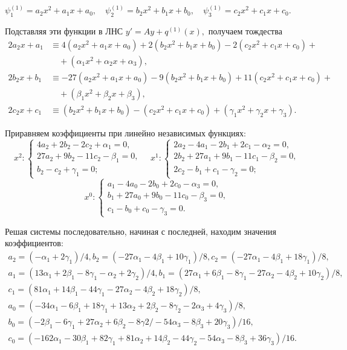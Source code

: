 \documentclass[11pt]{article}
\begin{document}
{\smallskip
$\psi_1^{(1)} = a_2 x^2 + a_1 x + a_0, \quad \psi_2^{(1)} = b_2 x^2 + b_1 x + b_0, \quad \psi_3^{(1)} = c_2 x^2 + c_1 x + c_0.$

\smallskip
Подставляя эти функции в ЛНС $y'=Ay+q^{(1)}(x),$ получаем тождества
\begin{align*}
2a_2 x + a_1 &\equiv 4(a_2 x^2 + a_1 x + a_0) + 2(b_2 x^2 + b_1 x + b_0) - 2(c_2 x^2 + c_1 x + c_0) +\\
             &\quad + (\alpha_1 x^2 + \alpha_2 x + \alpha_3), \\
2b_2 x + b_1 &\equiv -27(a_2 x^2 + a_1 x + a_0) - 9(b_2 x^2 + b_1 x + b_0) + 11(c_2 x^2 + c_1 x + c_0) +\\
             &\quad + (\beta_1 x^2 + \beta_2 x + \beta_3), \\
2c_2 x + c_1 &\equiv (b_2 x^2 + b_1 x + b_0) - (c_2 x^2 + c_1 x + c_0) + (\gamma_1 x^2 + \gamma_2 x + \gamma_3).
\end{align*}

\smallskip
Приравняем коэффициенты при линейно независимых функциях:
$$x^2:
\begin{cases}
4a_2 + 2b_2 - 2c_2 + \alpha_1 = 0, \\
27a_2 + 9b_2 - 11c_2 - \beta_1 = 0, \\
b_2 - c_2 + \gamma_1 = 0;
\end{cases} \quad
x^1:
\begin{cases}
2a_2 - 4a_1 - 2b_1 + 2c_1 - \alpha_2 = 0, \\
2b_2 + 27a_1 + 9b_1 - 11c_1 - \beta_2 = 0, \\
2c_2 -b_1 + c_1 - \gamma_2 = 0;
\end{cases}
$$
$$x^0:
\begin{cases}
a_1 - 4a_0 - 2b_0 + 2c_0 - \alpha_3 = 0, \\
b_1 + 27a_0 + 9b_0 - 11c_0 - \beta_3 = 0, \\
c_1 - b_0 + c_0 - \gamma_3 = 0.
\end{cases}
$$

Решая системы последовательно, начиная с последней, находим значения коэффициентов:
\[
\begin{array}{ll}
a_2 = (-\alpha_1 + 2\gamma_1)/4, b_2 = (-27\alpha_1 - 4\beta_1 + 10\gamma_1)/8, c_2 = (-27\alpha_1 - 4\beta_1 + 18\gamma_1)/8, & \\[6pt]
a_1 = (13\alpha_1 + 2\beta_1 - 8\gamma_1  - \alpha_2 + 2\gamma_2)/4, b_1 = (27\alpha_1 + 6\beta_1 - 8\gamma_1 -27\alpha_2 - 4\beta_2 + 10\gamma_2)/8, & \\
c_1 = (81\alpha_1 + 14\beta_1 - 44\gamma_1 - 27\alpha_2 - 4\beta_2 + 18\gamma_2)/8, & \\[6pt]
a_0 = (-34\alpha_1 - 6\beta_1 + 18\gamma_1 + 13\alpha_2 + 2\beta_2 - 8\gamma_2 - 2\alpha_3 + 4\gamma_3)/8, & \\[3pt]
b_0 = (-2\beta_1 - 6\gamma_1 + 27\alpha_2 + 6\beta_2 - 8\gamma2/ - 54\alpha_3 - 8\beta_3 + 20\gamma_3)/16, & \\
c_0 = (-162\alpha_1 - 30\beta_1 + 82\gamma_1 + 81\alpha_2 + 14\beta_2 - 44\gamma_2 - 54\alpha_3 -8\beta_3 +36\gamma_3)/16. &
\end{array}
\]

}
\end{document}
